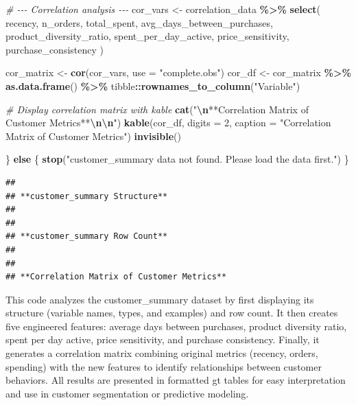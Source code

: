 \documentclass[
]{article}
\newenvironment{Shaded}{\begin{snugshade}}{\end{snugshade}}
\newcommand{\AttributeTok}[1]{\textcolor[rgb]{0.13,0.29,0.53}{#1}}
\newcommand{\CommentTok}[1]{\textcolor[rgb]{0.56,0.35,0.01}{\textit{#1}}}
\newcommand{\ControlFlowTok}[1]{\textcolor[rgb]{0.13,0.29,0.53}{\textbf{#1}}}
\newcommand{\DecValTok}[1]{\textcolor[rgb]{0.00,0.00,0.81}{#1}}
\newcommand{\FunctionTok}[1]{\textcolor[rgb]{0.13,0.29,0.53}{\textbf{#1}}}
\newcommand{\NormalTok}[1]{#1}
\newcommand{\OtherTok}[1]{\textcolor[rgb]{0.56,0.35,0.01}{#1}}
\newcommand{\SpecialCharTok}[1]{\textcolor[rgb]{0.81,0.36,0.00}{\textbf{#1}}}
\newcommand{\StringTok}[1]{\textcolor[rgb]{0.31,0.60,0.02}{#1}}
\begin{document}
\begin{Shaded}
\begin{Highlighting}[]
  \CommentTok{\# {-}{-}{-} Correlation analysis {-}{-}{-}}
\NormalTok{  cor\_vars }\OtherTok{\textless{}{-}}\NormalTok{ correlation\_data }\SpecialCharTok{\%\textgreater{}\%}
    \FunctionTok{select}\NormalTok{(}
\NormalTok{      recency,}
\NormalTok{      n\_orders,}
\NormalTok{      total\_spent,}
\NormalTok{      avg\_days\_between\_purchases,}
\NormalTok{      product\_diversity\_ratio,}
\NormalTok{      spent\_per\_day\_active,}
\NormalTok{      price\_sensitivity,}
\NormalTok{      purchase\_consistency}
\NormalTok{    )}

\NormalTok{  cor\_matrix }\OtherTok{\textless{}{-}} \FunctionTok{cor}\NormalTok{(cor\_vars, }\AttributeTok{use =} \StringTok{"complete.obs"}\NormalTok{)}
\NormalTok{  cor\_df }\OtherTok{\textless{}{-}}\NormalTok{ cor\_matrix }\SpecialCharTok{\%\textgreater{}\%}
    \FunctionTok{as.data.frame}\NormalTok{() }\SpecialCharTok{\%\textgreater{}\%}
\NormalTok{    tibble}\SpecialCharTok{::}\FunctionTok{rownames\_to\_column}\NormalTok{(}\StringTok{"Variable"}\NormalTok{)}

  \CommentTok{\# Display correlation matrix with kable}
  \FunctionTok{cat}\NormalTok{(}\StringTok{"}\SpecialCharTok{\textbackslash{}n}\StringTok{**Correlation Matrix of Customer Metrics**}\SpecialCharTok{\textbackslash{}n\textbackslash{}n}\StringTok{"}\NormalTok{)}
  \FunctionTok{kable}\NormalTok{(cor\_df, }\AttributeTok{digits =} \DecValTok{2}\NormalTok{, }\AttributeTok{caption =} \StringTok{"Correlation Matrix of Customer Metrics"}\NormalTok{)}
  \FunctionTok{invisible}\NormalTok{()}

\NormalTok{\} }\ControlFlowTok{else}\NormalTok{ \{}
  \FunctionTok{stop}\NormalTok{(}\StringTok{"customer\_summary data not found. Please load the data first."}\NormalTok{)}
\NormalTok{\}}
\end{Highlighting}
\end{Shaded}

\begin{verbatim}
## 
## **customer_summary Structure**
## 
## 
## **customer_summary Row Count**
## 
## 
## **Correlation Matrix of Customer Metrics**
\end{verbatim}

This code analyzes the customer\_summary dataset by first displaying its
structure (variable names, types, and examples) and row count. It then
creates five engineered features: average days between purchases,
product diversity ratio, spent per day active, price sensitivity, and
purchase consistency. Finally, it generates a correlation matrix
combining original metrics (recency, orders, spending) with the new
features to identify relationships between customer behaviors. All
results are presented in formatted gt tables for easy interpretation and
use in customer segmentation or predictive modeling.\newpage
\end{document}
